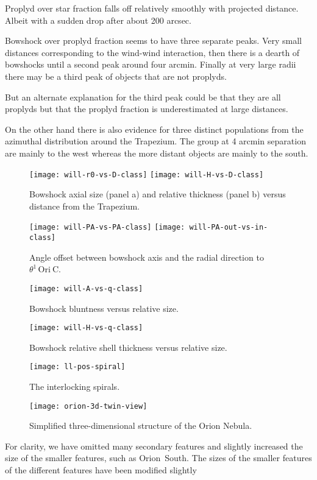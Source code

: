 \documentclass[apj, twocolumn]{aastex63}
\newcommand\thC{\ensuremath{\theta^1\,\mathrm{Ori~C}}}
\begin{document}
Proplyd over star fraction falls off relatively smoothly with
projected distance.  Albeit with a sudden drop after about
200 arcsec.


Bowshock over proplyd fraction seems to have three separate peaks.
Very small distances corresponding to the wind-wind interaction,
then there is a dearth of bowshocks until a second peak around
four arcmin.  Finally at very large radii there may be a third
peak of objects that are not proplyds.

But an alternate explanation for the third peak could be that
they are all proplyds but that the proplyd fraction is
underestimated at large distances.

On the other hand there is also evidence for three distinct
populations from the azimuthal distribution around the Trapezium.
The group at 4 arcmin separation are mainly to the west whereas
the more distant objects are mainly to the south.


\begin{figure}
  \centering
  \texttt{[image: will-r0-vs-D-class]}
  \texttt{[image: will-H-vs-D-class]}
  \caption{Bowshock axial size (panel a) and relative thickness (panel b) versus distance from the Trapezium.}
  \label{fig:size-v-distance}
\end{figure}
\begin{figure}
  \centering
  \texttt{[image: will-PA-vs-PA-class]}
  \texttt{[image: will-PA-out-vs-in-class]}
  \caption{Angle offset between bowshock axis and the radial direction to \thC{}.}
  \label{fig:PA-v-PA}
\end{figure}
\begin{figure}
  \centering
  \texttt{[image: will-A-vs-q-class]}
  \caption{Bowshock bluntness versus relative size.}
  \label{fig:A-v-q}
\end{figure}
\begin{figure}
  \centering
  \texttt{[image: will-H-vs-q-class]}
  \caption{Bowshock relative shell thickness versus relative size.}
  \label{fig:H-v-q}
\end{figure}

\begin{figure}
  \centering
  \texttt{[image: ll-pos-spiral]}
  \caption{The interlocking spirals.}
  \label{fig:spiral-bars}
\end{figure}

\begin{figure*}
  \centering
  \texttt{[image: orion-3d-twin-view]}
  \caption{Simplified three-dimensional structure of the Orion Nebula.}
  \label{fig:3d-twin}
\end{figure*}

For clarity, we have omitted many secondary features and slightly
increased the size of the smaller features, such as Orion~South. 
The sizes of the smaller features  of the different features have been
modified slightly


\end{document}
